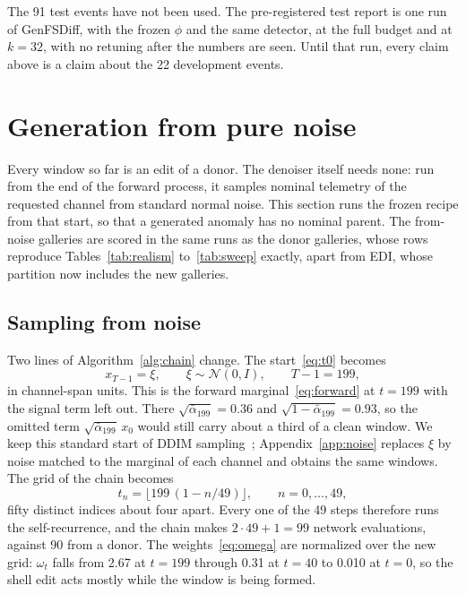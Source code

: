 \documentclass[11pt,a4paper]{article}
\newcommand{\abar}{\bar\alpha}
\newcommand{\phivec}{\phi}                 %
\begin{document}
The 91 test events have not been used. The pre-registered test report is one
run of GenFSDiff, with the frozen $\phivec$ and the same detector, at the full
budget and at $k = 32$, with no retuning after the numbers are seen. Until
that run, every claim above is a claim about the 22 development events.

\section{Generation from pure noise}
\label{sec:noise}

Every window so far is an edit of a donor. The denoiser itself needs none:
run from the end of the forward process, it samples nominal telemetry of the
requested channel from standard normal noise. This section runs the frozen
recipe from that start, so that a generated anomaly has no nominal parent.
The from-noise galleries are scored in the same runs as the donor galleries,
whose rows reproduce Tables~\ref{tab:realism} to~\ref{tab:sweep} exactly,
apart from EDI, whose partition now includes the new galleries.

\subsection{Sampling from noise}
\label{sec:noise-method}

Two lines of Algorithm~\ref{alg:chain} change. The start~\eqref{eq:t0}
becomes
\begin{equation}
\label{eq:xT}
x_{T-1} = \xi, \qquad \xi \sim \mathcal{N}(0, I), \qquad T - 1 = 199,
\end{equation}
in channel-span units. This is the forward marginal~\eqref{eq:forward} at
$t = 199$ with the signal term left out. There $\sqrt{\abar_{199}} = 0.36$
and $\sqrt{1 - \abar_{199}} = 0.93$, so the omitted term
$\sqrt{\abar_{199}}\,x_{0}$ would still carry about a third of a clean window.
We keep this standard start of DDIM sampling~\cite{song2021ddim};
Appendix~\ref{app:noise} replaces $\xi$ by noise matched to the marginal of
each channel and obtains the same windows. The grid of the chain becomes
\begin{equation}
\label{eq:gridT}
t_{n} = \bigl\lfloor 199\,(1 - n/49) \bigr\rfloor,
\qquad n = 0, \ldots, 49,
\end{equation}
fifty distinct indices about four apart. Every one of the 49 steps therefore
runs the self-recurrence, and the chain makes $2 \cdot 49 + 1 = 99$ network
evaluations, against 90 from a donor. The weights~\eqref{eq:omega} are
normalized over the new grid: $\omega_{t}$ falls from 2.67 at $t = 199$
through 0.31 at $t = 40$ to 0.010 at $t = 0$, so the shell edit acts mostly
while the window is being formed.
\end{document}
